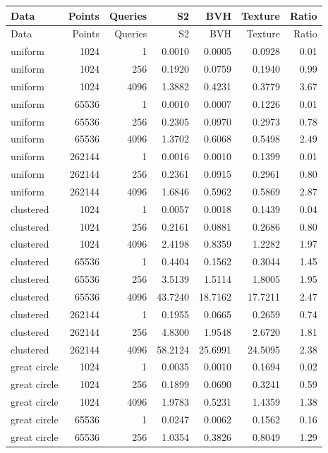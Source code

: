 {\small
\begin{longtable}{@{}lrrrrrr@{}}
\toprule Data & Points & Queries & S2 & BVH & Texture & Ratio\\\midrule
\endfirsthead
\toprule Data & Points & Queries & S2 & BVH & Texture & Ratio\\\midrule
\endhead
\bottomrule\endfoot
uniform & 1024 & 1 & 0.0010 & 0.0005 & 0.0928 & 0.01\\
uniform & 1024 & 256 & 0.1920 & 0.0759 & 0.1940 & 0.99\\
uniform & 1024 & 4096 & 1.3882 & 0.4231 & 0.3779 & 3.67\\
uniform & 65536 & 1 & 0.0010 & 0.0007 & 0.1226 & 0.01\\
uniform & 65536 & 256 & 0.2305 & 0.0970 & 0.2973 & 0.78\\
uniform & 65536 & 4096 & 1.3702 & 0.6068 & 0.5498 & 2.49\\
uniform & 262144 & 1 & 0.0016 & 0.0010 & 0.1399 & 0.01\\
uniform & 262144 & 256 & 0.2361 & 0.0915 & 0.2961 & 0.80\\
uniform & 262144 & 4096 & 1.6846 & 0.5962 & 0.5869 & 2.87\\
clustered & 1024 & 1 & 0.0057 & 0.0018 & 0.1439 & 0.04\\
clustered & 1024 & 256 & 0.2161 & 0.0881 & 0.2686 & 0.80\\
clustered & 1024 & 4096 & 2.4198 & 0.8359 & 1.2282 & 1.97\\
clustered & 65536 & 1 & 0.4404 & 0.1562 & 0.3044 & 1.45\\
clustered & 65536 & 256 & 3.5139 & 1.5114 & 1.8005 & 1.95\\
clustered & 65536 & 4096 & 43.7240 & 18.7162 & 17.7211 & 2.47\\
clustered & 262144 & 1 & 0.1955 & 0.0665 & 0.2659 & 0.74\\
clustered & 262144 & 256 & 4.8300 & 1.9548 & 2.6720 & 1.81\\
clustered & 262144 & 4096 & 58.2124 & 25.6991 & 24.5095 & 2.38\\
great circle & 1024 & 1 & 0.0035 & 0.0010 & 0.1694 & 0.02\\
great circle & 1024 & 256 & 0.1899 & 0.0690 & 0.3241 & 0.59\\
great circle & 1024 & 4096 & 1.9783 & 0.5231 & 1.4359 & 1.38\\
great circle & 65536 & 1 & 0.0247 & 0.0062 & 0.1562 & 0.16\\
great circle & 65536 & 256 & 1.0354 & 0.3826 & 0.8049 & 1.29\\

\end{longtable}}
